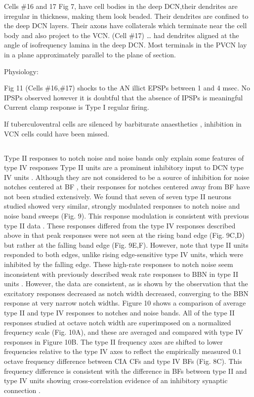 \documentclass[10pt,a4paper]{article}
\begin{document}
Cells \#16 and 17 Fig 7, have cell bodies in the deep DCN,their dendrites are
irregular in thickness, making them look beaded.  Their dendrites are confined
to the deep DCN layers.  Their axons have collaterals which terminate near the
cell body and also project to the VCN.  (Cell \#17) {\dots} had dendrites
aligned at the angle of isofrequency lamina in the deep DCN.  Most terminals in
the PVCN lay in a plane approximately parallel to the plane of section.

Physiology:

Fig 11 (Cells \#16,\#17) shocks to the AN illict EPSPs between 1 and 4 msec.  No
IPSPs observed however it is doubtful that the absence of IPSPs is meaningful
Current clamp response is Type I regular firing.

If tuberculoventral cells are silenced by barbiturate anaesthetics
\citep{EvansNelson:1973,RhodeOertelEtAl:1983a,RhodeOertelEtAl:1983,YoungBrownell:1976},
inhibition in VCN cells could have been missed.


\subsection{\citep{ReissYoung:2005}}


Type II responses to notch noise and noise bands only explain some features of
type IV responses Type II units are a prominent inhibitory input to DCN type IV
units \citep{VoigtYoung:1990}. Although they are not considered to be a source
of inhibition for noise notches centered at BF \citep{NelkenYoung:1994}, their
responses for notches centered away from BF have not been studied extensively.
We found that seven of seven type II neurons studied showed very similar,
strongly modulated responses to notch noise and noise band sweeps (Fig. 9). This
response modulation is consistent with previous type II data
\citep{NelkenYoung:1994}.  These responses differed from the type IV responses
described above in that peak responses were not seen at the rising band edge
(Fig. 9C,D) but rather at the falling band edge (Fig. 9E,F). However, note that
type II units responded to both edges, unlike rising edge-sensitive type IV
units, which were inhibited by the falling edge.  These high-rate responses to
notch noise seem inconsistent with previously described weak rate responses to
BBN in type II units \citep{YoungVoigt:1982,SpirouDavisEtAl:1999}. However, the
data are consistent, as is shown by the observation that the excitatory
responses decreased as notch width decreased, converging to the BBN response at
very narrow notch widths.  Figure 10 shows a comparison of average type II and
type IV responses to notches and noise bands. All of the type II responses
studied at octave notch width are superimposed on a normalized frequency scale
(Fig. 10A), and these are averaged and compared with type IV responses in Figure
10B. The type II frequency axes are shifted to lower frequencies relative to the
type IV axes to reflect the empirically measured 0.1 octave frequency difference
between CIA CFs and type IV BFs (Fig. 8C). This frequency difference is
consistent with the difference in BFs between type II and type IV units showing
cross-correlation evidence of an inhibitory synaptic connection
\citep{VoigtYoung:1990}.
\end{document}
